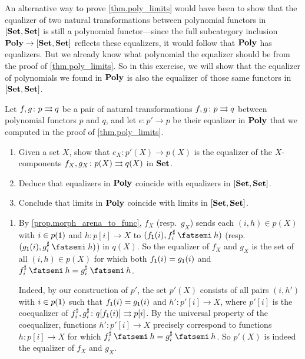 \documentclass[Book-Poly]{subfiles}
\begin{document}
\begin{exercise} \label{exc.refl_limits}
An alternative way to prove \cref{thm.poly_limits} would have been to show that the equalizer of two natural transformations between polynomial functors in $[\mathbf{Set},\mathbf{Set}]$ is still a polynomial functor---since the full subcategory inclusion $\mathbf{Poly} \to [\mathbf{Set},\mathbf{Set}]$ reflects these equalizers, it would follow that $\mathbf{Poly}$ has equalizers.
But we already know what polynomial the equalizer should be from the proof of \cref{thm.poly_limits}.
So in this exercise, we will show that the equalizer of polynomials we found in $\mathbf{Poly}$ is also the equalizer of those same functors in $[\mathbf{Set},\mathbf{Set}]$.

Let $f,g\colon p\rightrightarrows q$ be a pair of natural transformations $f,g\colon p\rightrightarrows q$ between polynomial functors $p$ and $q$, and let $e\colon p'\to p$ be their equalizer in $\mathbf{Poly}$ that we computed in the proof of \cref{thm.poly_limits}.
\begin{enumerate}
    \item Given a set $X$, show that $e_X\colon p'(X)\to p(X)$ is the equalizer of the $X$-components $f_X,g_X\colon p(X)\rightrightarrows q(X)$ in $\mathbf{Set}$.
    \item Deduce that equalizers in $\mathbf{Poly}$ coincide with equalizers in $[\mathbf{Set},\mathbf{Set}]$.
    \item Conclude that limits in $\mathbf{Poly}$ coincide with limits in $[\mathbf{Set},\mathbf{Set}]$. \qedhere
\end{enumerate}
\begin{solution}
\begin{enumerate}
    \item By \cref{prop.morph_arena_to_func}, $f_X$ (resp.\ $g_X$) sends each $(i,h)\in p(X)$ with $i\in p(\textsf{1})$ and $h\colon p[i]\to X$ to $(f_\1(i), f^\sharp_i\then h)$ (resp.\ $(g_\1(i), g^\sharp_i\then h)$) in $q(X)$.
    So the equalizer of $f_X$ and $g_X$ is the set of all $(i,h)\in p(X)$ for which both $f_{\textsf{1}}(i) = g_{\textsf{1}}(i)$ and $f^\sharp_i\then h = g^\sharp_i\then h$.
    
    Indeed, by our construction of $p'$, the set $p'(X)$ consists of all pairs $(i,h')$ with $i\in p(\textsf{1})$ such that $f_{\textsf{1}}(i) = g_{\textsf{1}}(i)$ and $h'\colon p'[i]\to X$, where $p'[i]$ is the coequalizer of $f^\sharp_i,g^\sharp_i\colon q[f_{\textsf{1}}(i)]\rightrightarrows p[i]$.
    By the universal property of the coequalizer, functions $h'\colon p'[i]\to X$ precisely correspond to functions $h\colon p[i]\to X$ for which $f^\sharp_i\then h = g^\sharp_i\then h$.
    So $p'(X)$ is indeed the equalizer of $f_X$ and $g_X$.
    

\end{enumerate}
\end{solution}
\end{exercise}
\end{document}
